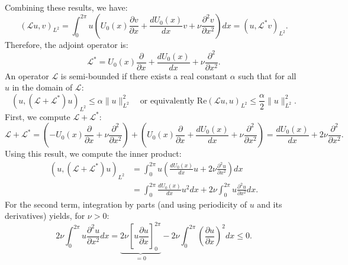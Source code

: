 Combining these results, we have:
\begin{equation}
    (\mathcal{L}u , v )_{L^2} =  \int_0^{2\pi} u \left ( U_0(x) \frac{\partial v}{\partial x} +  \frac{d U_0(x)}{d x} v  +  \nu \frac{\partial^2 v}{\partial x^2} \right) dx = (u, \mathcal{L}^* v)_{L^2}.
    \label{eq:adj_eq_final}
\end{equation}
Therefore, the adjoint operator is:
\begin{equation}
    \mathcal{L}^* = U_0(x) \frac{\partial}{\partial x} +  \frac{d U_0(x)}{d x}  +  \nu \frac{\partial^2}{\partial x^2}.
    \label{eq:adj_op_final}
\end{equation}
An operator $\mathcal{L}$ is semi-bounded if there exists a real constant $\alpha$ such that for all $u$ in the domain of $\mathcal{L}$:
\begin{equation}
    \left(u,\left(\mathcal{L}+\mathcal{L}^*\right) u\right)_{L^2} \leq \alpha\|u\|_{L^2}^2 \quad \text{or equivalently } \text{Re}(\mathcal{L}u, u)_{L^2} \leq \frac{\alpha}{2} \|u\|_{L^2}^2 \text{}.
    \label{eq:semi_bounded_def}
\end{equation}
First, we compute $\mathcal{L} + \mathcal{L}^*$:
\begin{equation}
    \mathcal{L} + \mathcal{L}^* = \left (  - U_0(x) \frac{\partial}{\partial x} + \nu \frac{\partial^2}{\partial x^2} \right) + \left  (U_0(x) \frac{\partial}{\partial x} +  \frac{d U_0(x)}{d x}  +  \nu \frac{\partial^2}{\partial x^2} \right ) = \frac{d U_0(x)}{d x}  +  2\nu \frac{\partial^2}{\partial x^2}.
    \label{eq:L_plus_L_star}
\end{equation}
Using this result, we compute the inner product:
\begin{equation}
    \begin{aligned}
        (u, (\mathcal{L}+\mathcal{L}^*)u)_{L^2} & = \int_0^{2\pi} u\left(\frac{dU_0(x)}{dx}u + 2\nu\frac{\partial^2 u}{\partial x^2}\right) dx  \\
                                               & = \int_0^{2\pi} \frac{dU_0(x)}{dx}u^2 dx + 2\nu\int_0^{2\pi} u\frac{\partial^2 u}{\partial x^2} dx.
    \end{aligned}
    \label{eq:uLLu_expanded}
\end{equation}
For the second term, integration by parts (and using periodicity of $u$ and its derivatives) yields, for $\nu > 0$:
\begin{equation}
    2 \nu \int_0^{2 \pi} u \frac{\partial^2 u}{\partial x^2} dx = \underbrace{2\nu \left[u \frac{\partial u}{\partial x}\right]_0^{2\pi}}_{=0} - 2 \nu \int_0^{2 \pi} \left (\frac{\partial u}{\partial x} \right )^2 dx  \leq 0.
    \label{eq:diff_term_energy}
\end{equation}
